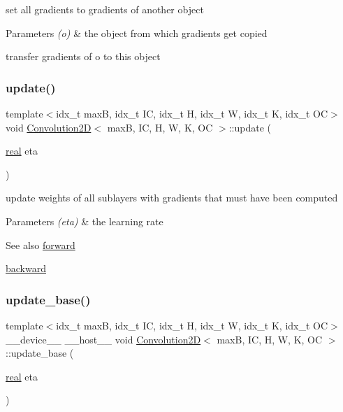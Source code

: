 set all gradients to gradients of another object 


\begin{DoxyParams}{Parameters}
{\em (o)} & the object from which gradients get copied\\
\hline
\end{DoxyParams}
transfer gradients of o to this object \mbox{\label{structConvolution2D_ac9fd666f96904bb7f62dc39cebae7a25}} 
\subsubsection{\texorpdfstring{update()}{update()}}
{\footnotesize\ttfamily template$<$idx\+\_\+t maxB, idx\+\_\+t IC, idx\+\_\+t H, idx\+\_\+t W, idx\+\_\+t K, idx\+\_\+t OC$>$ \\
void \hyperlink{structConvolution2D}{Convolution2D}$<$ maxB, IC, H, W, K, OC $>$\+::update (\begin{DoxyParamCaption}\item[{\hyperlink{vgg__util_8h_a1082d08aaa761215ec83e7149f27ad16}{real}}]{eta }\end{DoxyParamCaption})\hspace{0.3cm}{\ttfamily [inline]}}



update weights of all sublayers with gradients that must have been computed 


\begin{DoxyParams}{Parameters}
{\em (eta)} & the learning rate \\
\hline
\end{DoxyParams}
\begin{DoxySeeAlso}{See also}
\hyperlink{structConvolution2D_ae6dcfaea38b779de24bbda730c57083e}{forward} 

\hyperlink{structConvolution2D_ace928f0589a42b6505f5787652ffbacd}{backward} 
\end{DoxySeeAlso}
\mbox{\label{structConvolution2D_a5134826f56423c7629434f4c9ea40a1f}} 
\subsubsection{\texorpdfstring{update\+\_\+base()}{update\_base()}}
{\footnotesize\ttfamily template$<$idx\+\_\+t maxB, idx\+\_\+t IC, idx\+\_\+t H, idx\+\_\+t W, idx\+\_\+t K, idx\+\_\+t OC$>$ \\
\+\_\+\+\_\+device\+\_\+\+\_\+ \+\_\+\+\_\+host\+\_\+\+\_\+ void \hyperlink{structConvolution2D}{Convolution2D}$<$ maxB, IC, H, W, K, OC $>$\+::update\+\_\+base (\begin{DoxyParamCaption}\item[{\hyperlink{vgg__util_8h_a1082d08aaa761215ec83e7149f27ad16}{real}}]{eta }\end{DoxyParamCaption})\hspace{0.3cm}{\ttfamily [inline]}}



